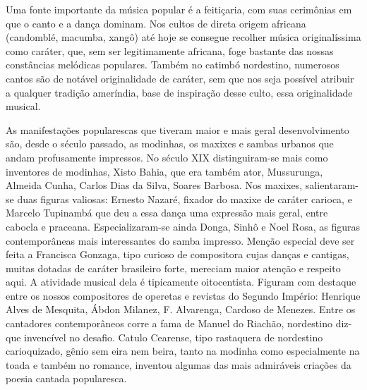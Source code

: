 Uma fonte importante da música popular é a feitiçaria, com suas
cerimônias em que o canto e a dança dominam. Nos cultos de direta origem
africana (candomblé, macumba, xangô) até hoje se consegue recolher
música originalíssima como caráter, que, sem ser legitimamente africana,
foge bastante das nossas constâncias melódicas populares. Também no
catimbó nordestino, numerosos cantos são de notável originalidade de
caráter, sem que nos seja possível atribuir a qualquer tradição
ameríndia, base de inspiração desse culto, essa originalidade musical.

As manifestações popularescas que tiveram maior e mais geral
desenvolvimento são, desde o século passado, as modinhas, os maxixes e
sambas urbanos que andam profusamente impressos. No século XIX
distinguiram-se mais como inventores de modinhas, Xisto Bahia, que era
também ator, Mussurunga, Almeida Cunha, Carlos Dias da Silva, Soares
Barbosa. Nos maxixes, salientaram-se duas figuras valiosas: Ernesto
Nazaré, fixador do maxixe de caráter carioca, e Marcelo Tupinambá que
deu a essa dança uma expressão mais geral, entre cabocla e praceana.
Especializaram-se ainda Donga, Sinhô e Noel Rosa, as figuras
contemporâneas mais interessantes do samba impresso. Menção especial
deve ser feita a Francisca Gonzaga, tipo curioso de compositora cujas
danças e cantigas, muitas dotadas de caráter brasileiro forte, mereciam
maior atenção e respeito aqui. A atividade musical dela é tipicamente
oitocentista. Figuram com destaque entre os nossos compositores de
operetas e revistas do Segundo Império: Henrique Alves de Mesquita,
Ábdon Milanez, F. Alvarenga, Cardoso de Menezes. Entre os cantadores
contemporâneos corre a fama de Manuel do Riachão, nordestino diz-que
invencível no desafio. Catulo Cearense, tipo rastaquera de nordestino
carioquizado, gênio sem eira nem beira, tanto na modinha como
especialmente na toada e também no romance, inventou algumas das mais
admiráveis criações da poesia cantada popularesca.


